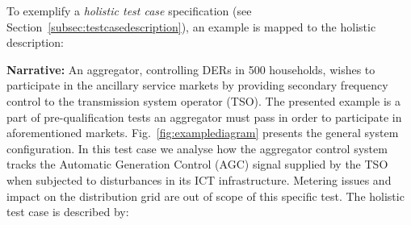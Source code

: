 To exemplify a \emph{holistic test case} specification (see Section~\ref{subsec:testcasedescription}), an example is mapped to the holistic description:

\textbf{Narrative:} 
An aggregator, controlling DERs in 500 households, wishes to participate in the ancillary service markets by providing secondary frequency control to the transmission system operator (TSO). The presented example is a part of pre-qualification tests an aggregator must pass \cite{bondy2016procedure} in order to participate in aforementioned markets. Fig.~\ref{fig:examplediagram} presents the general system configuration. In this test case we analyse how the aggregator control system tracks the Automatic Generation Control (AGC) signal supplied by the TSO when subjected to disturbances in its ICT infrastructure. Metering issues and impact on the distribution grid are out of scope of this specific test. The holistic test case is described by:
